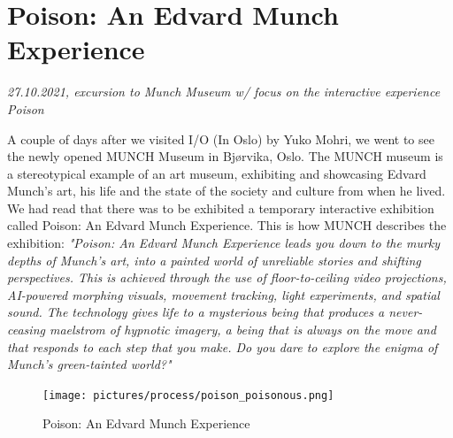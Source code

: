 \section{Poison: An Edvard Munch Experience}
\par
\emph{27.10.2021, excursion to Munch Museum w/ focus on the interactive experience Poison}
\par

A couple of days after we visited I/O (In Oslo) by Yuko Mohri, we went to see the newly opened MUNCH Museum in Bjørvika, Oslo. The MUNCH museum is a stereotypical example of an art museum, exhibiting and showcasing Edvard Munch's art, his life and the state of the society and culture from when he lived. We had read that there was to be exhibited a temporary interactive exhibition called Poison: An Edvard Munch Experience. This is how MUNCH describes the exhibition: \emph{"Poison: An Edvard Munch Experience leads you down to the murky depths of Munch’s art, into a painted world of unreliable stories and shifting perspectives. This is achieved through the use of floor-to-ceiling video projections, AI-powered morphing visuals, movement tracking, light experiments, and spatial sound. The technology gives life to a mysterious being that produces a never-ceasing maelstrom of hypnotic imagery, a being that is always on the move and that responds to each step that you make. Do you dare to explore the enigma of Munch’s green-tainted world?"}\autocite{munch_poison_web}

\begin{figure}[H]
\texttt{[image: pictures/process/poison\_poisonous.png]}
\caption{Poison: An Edvard Munch Experience}
\centering
\end{figure}

